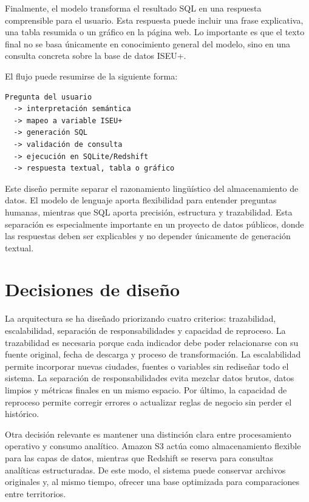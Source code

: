 Finalmente, el modelo transforma el resultado SQL en una respuesta comprensible para el usuario. Esta respuesta puede incluir una frase explicativa, una tabla resumida o un gráfico en la página web. Lo importante es que el texto final no se basa únicamente en conocimiento general del modelo, sino en una consulta concreta sobre la base de datos ISEU+.

El flujo puede resumirse de la siguiente forma:

\begin{verbatim}
Pregunta del usuario
  -> interpretación semántica
  -> mapeo a variable ISEU+
  -> generación SQL
  -> validación de consulta
  -> ejecución en SQLite/Redshift
  -> respuesta textual, tabla o gráfico
\end{verbatim}

Este diseño permite separar el razonamiento lingüístico del almacenamiento de datos. El modelo de lenguaje aporta flexibilidad para entender preguntas humanas, mientras que SQL aporta precisión, estructura y trazabilidad. Esta separación es especialmente importante en un proyecto de datos públicos, donde las respuestas deben ser explicables y no depender únicamente de generación textual.

\section{Decisiones de diseño}

La arquitectura se ha diseñado priorizando cuatro criterios: trazabilidad, escalabilidad, separación de responsabilidades y capacidad de reproceso. La trazabilidad es necesaria porque cada indicador debe poder relacionarse con su fuente original, fecha de descarga y proceso de transformación. La escalabilidad permite incorporar nuevas ciudades, fuentes o variables sin rediseñar todo el sistema. La separación de responsabilidades evita mezclar datos brutos, datos limpios y métricas finales en un mismo espacio. Por último, la capacidad de reproceso permite corregir errores o actualizar reglas de negocio sin perder el histórico.

Otra decisión relevante es mantener una distinción clara entre procesamiento operativo y consumo analítico. Amazon S3 actúa como almacenamiento flexible para las capas de datos, mientras que Redshift se reserva para consultas analíticas estructuradas. De este modo, el sistema puede conservar archivos originales y, al mismo tiempo, ofrecer una base optimizada para comparaciones entre territorios.

